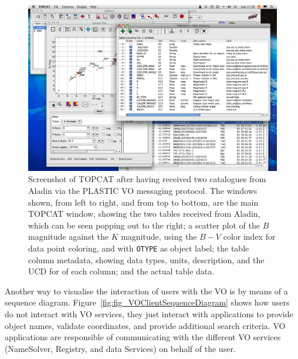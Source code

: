 		\begin{figure}[tbp]
			\centering
				\includegraphics[width=\columnwidth]
				{fig/TopcatDatosSimbad.png}
			\caption[Screenshot of TOPCAT]
			{
				Screenshot of TOPCAT after having received two
				catalogues from Aladin via the PLASTIC VO messaging
				protocol. The windows shown, from left to right, and
				from top to bottom, are the main TOPCAT window,
				showing the two tables received from Aladin, which
				can be seen popping out to the right; a scatter
				plot of the $B$ magnitude against the $K$
				magnitude, using the $B-V$ color index for data
				point coloring, and with \texttt{OTYPE} as object
				label; the table column metadata, showing data
				types, units, description, and the UCD for of each
				column;
				and the actual table data.
			}
			\label{fig:fig_TopcatDatosSimbad}
		\end{figure}
		
		 Another way to visualise the interaction of users with the
		VO is by means of a sequence diagram.
		Figure~\ref{fig:fig_VOClientSequenceDiagram} shows how
		users do not interact with VO services, they just interact
		with applications to provide object names, validate
		coordinates, and provide additional search criteria. VO
		applications are responsible of communicating with the
		different VO services (NameSolver, Registry, and data
		Services) on behalf of the user.
		
		
